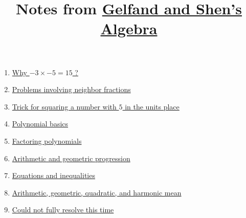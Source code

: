 \documentclass[12pt]{article}
\title{Notes from \href{https://archive.org/details/algebra_gelfand/mode/2up}{Gelfand and Shen's Algebra}}
\date{}
\begin{document}
\maketitle

\begin{enumerate}

\item 	\href{https://github.com/tanv1r/math/tree/master/algebra/2004_gelfand_shen/negative_times_negative/negative_times_negative.pdf}{Why $-3 \times -5 = 15$ ?}

\item \href{https://github.com/tanv1r/math/tree/master/algebra/2004_gelfand_shen/neighbor_fractions/neighbor_fractions.pdf}{Problems involving neighbor fractions}

\item \href{https://github.com/tanv1r/math/tree/master/algebra/2004_gelfand_shen/units_five_square_trick/units_five_square_trick.pdf}{Trick for squaring a number with $5$ in the units place}

\item \href{https://github.com/tanv1r/math/blob/master/algebra/2004_gelfand_shen/polynomial_warm_up/polynomial_warm_up.pdf}{Polynomial basics}

\item \href{https://github.com/tanv1r/math/blob/master/algebra/2004_gelfand_shen/polynomial_factoring/factor.pdf}{Factoring polynomials}

\item \href{https://github.com/tanv1r/math/blob/master/algebra/2004_gelfand_shen/progression/progression.pdf}{Arithmetic and geometric progression}

\item \href{https://github.com/tanv1r/math/blob/master/algebra/2004_gelfand_shen/eq_ineq/equations_inequalities.pdf}{Equations and inequalities}

\item \href{https://github.com/tanv1r/math/blob/master/algebra/2004_gelfand_shen/means/means.pdf}{Arithmetic, geometric, quadratic, and harmonic mean}

\item \href{https://github.com/tanv1r/math/blob/master/algebra/2004_gelfand_shen/unresolved.pdf}{Could not fully resolve this time}

\end{enumerate}
\end{document}

